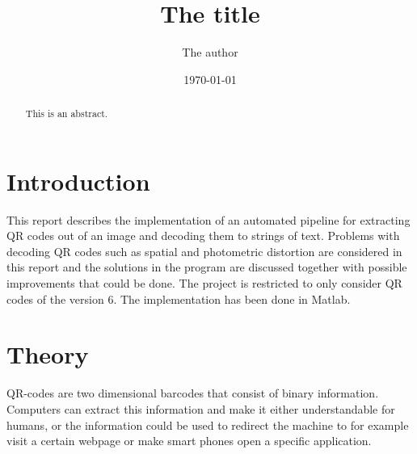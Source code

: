 \documentclass[12pt,a4paper]{article}
\begin{document}
 
\title{The title}
\author{The author}
\date{\today}
 
 
\newpage\null\thispagestyle{empty}\newpage
 
\newpage %
 
\begin{abstract}
  This is an abstract.
\end{abstract}
 
\newpage
 
\tableofcontents
 
\newpage{}
\section{Introduction}
This report describes the implementation of an automated pipeline for extracting QR codes out of an image and decoding them to strings of text. Problems with decoding QR codes such as spatial and photometric distortion are considered in this report and the solutions in the program are discussed together with possible improvements that could be done. The project is restricted to only consider QR codes of the version 6. The implementation has been done in Matlab.

\section{Theory}
QR-codes are two dimensional barcodes that consist of binary information. Computers can extract this information and make it either understandable for humans, or the information could be used to redirect the machine to for example visit a certain webpage or make smart phones open a specific application. 
\end{document}

